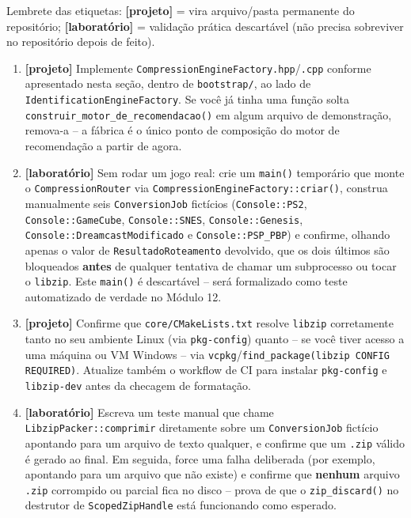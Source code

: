 \begin{CaixaDesafio}
Lembrete das etiquetas: \textbf{[projeto]} = vira arquivo/pasta permanente do repositório;
\textbf{[laboratório]} = validação prática descartável (não precisa sobreviver no repositório depois de feito).

\begin{enumerate}[label=\textbf{3.\arabic*}]
    \item \textbf{[projeto]} Implemente \texttt{CompressionEngineFactory.hpp}/\texttt{.cpp} conforme apresentado nesta seção, dentro de \texttt{bootstrap/}, ao lado de \texttt{IdentificationEngineFactory}. Se você já tinha uma função solta \texttt{construir\_motor\_de\_recomendacao()} em algum arquivo de demonstração, remova-a -- a fábrica é o único ponto de composição do motor de recomendação a partir de agora.
    \item \textbf{[laboratório]} Sem rodar um jogo real: crie um \texttt{main()} temporário que monte o \texttt{CompressionRouter} via \texttt{CompressionEngineFactory::criar()}, construa manualmente seis \texttt{ConversionJob} fictícios (\texttt{Console::PS2}, \texttt{Console::GameCube}, \texttt{Console::SNES}, \texttt{Console::Genesis}, \texttt{Console::DreamcastModificado} e \texttt{Console::PSP\_PBP}) e confirme, olhando apenas o valor de \texttt{ResultadoRoteamento} devolvido, que os dois últimos são bloqueados \textbf{antes} de qualquer tentativa de chamar um subprocesso ou tocar o \texttt{libzip}. Este \texttt{main()} é descartável -- será formalizado como teste automatizado de verdade no Módulo 12.
    \item \textbf{[projeto]} Confirme que \texttt{core/CMakeLists.txt} resolve \texttt{libzip} corretamente tanto no seu ambiente Linux (via \texttt{pkg-config}) quanto -- se você tiver acesso a uma máquina ou VM Windows -- via \texttt{vcpkg}/\texttt{find\_package(libzip CONFIG REQUIRED)}. Atualize também o workflow de CI para instalar \texttt{pkg-config} e \texttt{libzip-dev} antes da checagem de formatação.
    \item \textbf{[laboratório]} Escreva um teste manual que chame \texttt{LibzipPacker::comprimir} diretamente sobre um \texttt{ConversionJob} fictício apontando para um arquivo de texto qualquer, e confirme que um \texttt{.zip} válido é gerado ao final. Em seguida, force uma falha deliberada (por exemplo, apontando para um arquivo que não existe) e confirme que \textbf{nenhum} arquivo \texttt{.zip} corrompido ou parcial fica no disco -- prova de que o \texttt{zip\_discard()} no destrutor de \texttt{ScopedZipHandle} está funcionando como esperado.

\end{enumerate}
\end{CaixaDesafio}
